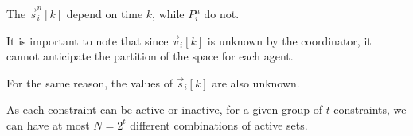 \documentclass{ifacconf}  %
\begin{document}









\begin{remark}\label{rmk:P_constant}
The $\vec{s}_{i}^{n}[k]$ depend on time $k$, while $P_{i}^{n}$ do not.
\end{remark}


\begin{challenge}\label{ch:zone_unknown}
  It is important to note that since $\vec{v}_{i}[k]$ is unknown by the coordinator, it cannot anticipate the partition of the space for each agent.
\end{challenge}
\begin{challenge}\label{ch:s_unknown}
 For the same reason, the values of $\vec{s}_{i}[k]$ are also unknown.
\end{challenge}

 As each constraint can be active or inactive, for a given group of $t$ constraints, we can have at most ${N=2^{t}}$ different combinations of active sets.
\end{document}
